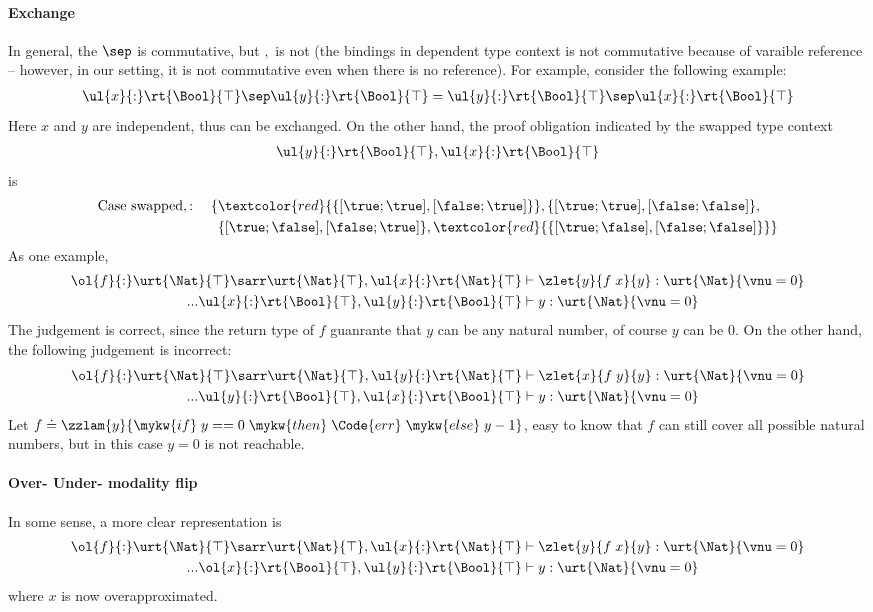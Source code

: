 \paragraph{Exchange} In general, the $\sep$ is commutative, but $,$ is not (the bindings in dependent type context is not commutative because of varaible reference -- however, in our setting, it is not commutative even when there is no reference). For example, consider the following example:
\begin{align*}
    \ul{x}{:}\rt{\Bool}{\top} \sep \ul{y}{:}\rt{\Bool}{\top} = \ul{y}{:}\rt{\Bool}{\top} \sep \ul{x}{:}\rt{\Bool}{\top}
\end{align*}\noindent
Here $x$ and $y$ are independent, thus can be exchanged. On the other hand, the proof obligation indicated by the swapped type context
\begin{align*}
    \ul{y}{:}\rt{\Bool}{\top}, \ul{x}{:}\rt{\Bool}{\top} 
\end{align*}\noindent
is
\begin{align*}
    \text{Case swapped}, : \quad \{& \textcolor{red}{\{[\true; \true], [\false; \true]\}}, \{[\true; \true], [\false; \false]\}, 
    \\&\{[\true; \false], [\false; \true]\}, \textcolor{red}{\{[\true; \false], [\false; \false]\}}\}
\end{align*}\noindent
As one example,
\begin{align*}
    \ol{f}{:}\urt{\Nat}{\top}\sarr\urt{\Nat}{\top}, \ul{x}{:}\rt{\Nat}{\top} &\vdash \zlet{y}{f\;x}{y} : \urt{\Nat}{\vnu = 0}
    \\ ... \ul{x}{:}\rt{\Bool}{\top}, \ul{y}{:}\rt{\Bool}{\top} &\vdash y : \urt{\Nat}{\vnu = 0}
\end{align*}\noindent
The judgement is correct, since the return type of $f$ guanrante that $y$ can be any natural number, of course $y$ can be $0$. On the other hand, the following judgement is incorrect:
\begin{align*}
    \ol{f}{:}\urt{\Nat}{\top}\sarr\urt{\Nat}{\top}, \ul{y}{:}\rt{\Nat}{\top} &\vdash \zlet{x}{f\;y}{y} : \urt{\Nat}{\vnu = 0}
    \\ ... \ul{y}{:}\rt{\Bool}{\top}, \ul{x}{:}\rt{\Bool}{\top} &\vdash y : \urt{\Nat}{\vnu = 0}
\end{align*}\noindent
Let $f \doteq \zzlam{y}{\mykw{if}\; y == 0 \;\mykw{then}\; \Code{err} \;\mykw{else}\; y - 1}$, easy to know that $f$ can still cover all possible natural numbers, but in this case $y = 0$ is not reachable.

\paragraph{Over- Under- modality flip}
In some sense, a more clear representation is
\begin{align*}
    \ol{f}{:}\urt{\Nat}{\top}\sarr\urt{\Nat}{\top}, \ul{x}{:}\rt{\Nat}{\top} &\vdash \zlet{y}{f\;x}{y} : \urt{\Nat}{\vnu = 0}
    \\ ... \ol{x}{:}\rt{\Bool}{\top}, \ul{y}{:}\rt{\Bool}{\top} &\vdash y : \urt{\Nat}{\vnu = 0}
\end{align*}\noindent
where $x$ is now overapproximated.

